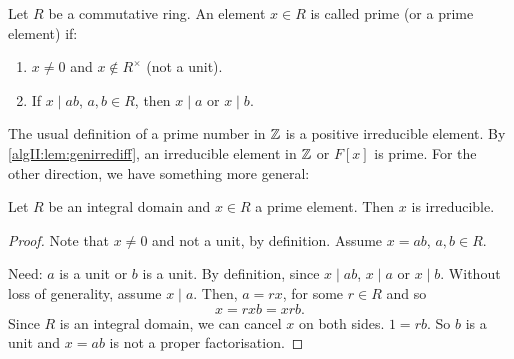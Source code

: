 \documentclass[10pt, a4paper]{article}
\begin{document}
\begin{definition}
    Let $R$ be a commutative ring.
    An element $x \in R$ is called prime
    (or a prime element)
    if:
    \begin{enumerate}[label = (\roman*)]
        \item $x \neq 0$ and $x \notin R ^ {\times}$
        (not a unit).

        \item If $x \mid ab$,
        $a, b \in R$,
        then $x \mid a$ or $x \mid b$.
    \end{enumerate}
\end{definition}

The usual definition of a prime number in $\mathbb{Z}$ is a positive irreducible element.
By \autoref{algII:lem:genirrediff},
an irreducible element in $\mathbb{Z}$ or $F[x]$ is prime.
For the other direction,
we have something more general:

\begin{lemma}\label{algII:lem:integthenprimeirred}
    Let $R$ be an integral domain and $x \in R$ a prime element.
    Then $x$ is irreducible.

    \begin{proof}
        Note that $x \neq 0$ and not a unit,
        by definition.
        Assume $x = ab$,
        $a, b \in R$.

        Need:
        $a$ is a unit or $b$ is a unit.
        By definition,
        since $x \mid ab$,
        $x \mid a$ or $x \mid b$.
        Without loss of generality,
        assume $x \mid a$.
        Then,
        $a = rx$,
        for some $r \in R$ and so
        \[
        x = rxb = xrb.
        \]
        Since $R$ is an integral domain,
        we can cancel $x$ on both sides.
        $1 = rb$.
        So $b$ is a unit and $x = ab$ is not a proper factorisation.
    \end{proof}
\end{lemma}
\end{document}
